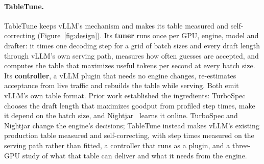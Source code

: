 \documentclass{article}
\newcommand{\sys}{TableTune}
\begin{document}
\paragraph{\sys{}.} \sys{} keeps vLLM's mechanism and makes its table measured and self-correcting (Figure~\ref{fig:design}). Its \textbf{tuner} runs once per GPU, engine, model and drafter: it times one decoding step for a grid of batch sizes and every draft length through vLLM's own serving path, measures how often guesses are accepted, and computes the table that maximizes useful tokens per second at every batch size. Its \textbf{controller}, a vLLM plugin that needs no engine changes, re-estimates acceptance from live traffic and rebuilds the table while serving. Both emit vLLM's own table format. Prior work established the ingredients: TurboSpec~\cite{liu2024turbospec} chooses the draft length that maximizes goodput from profiled step times, \citet{su2023synergy} make it depend on the batch size, and Nightjar~\cite{li2025nightjar} learns it online. TurboSpec and Nightjar change the engine's decisions; \sys{} instead makes vLLM's existing production table measured and self-correcting, with step times measured on the serving path rather than fitted, a controller that runs as a plugin, and a three-GPU study of what that table can deliver and what it needs from the engine.
\end{document}

